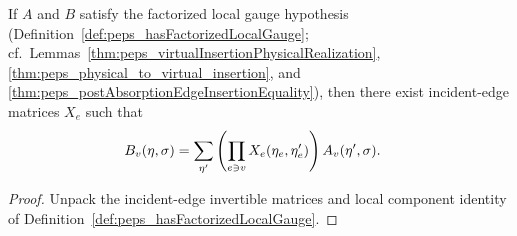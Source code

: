 \begin{lemma}%
    \label{thm:localGauge_exists}
    \leanok
    If $A$ and $B$ satisfy the factorized local gauge hypothesis
    (Definition~\ref{def:peps_hasFactorizedLocalGauge}; cf.\
    Lemmas~\ref{thm:peps_virtualInsertionPhysicalRealization},
    \ref{thm:peps_physical_to_virtual_insertion}, and
    \ref{thm:peps_postAbsorptionEdgeInsertionEquality}), then there exist
    incident-edge matrices $X_e$ such that
    \begin{align}
        B_v(\eta,\sigma)
         & =
        \sum_{\eta'}
        \left(\prod_{e\ni v}X_e(\eta_e,\eta'_e)\right)
        A_v(\eta',\sigma).
        \notag
    \end{align}
\end{lemma}
\begin{proof}\leanok
    Unpack the incident-edge invertible matrices and local component identity of
    Definition~\ref{def:peps_hasFactorizedLocalGauge}.
\end{proof}

